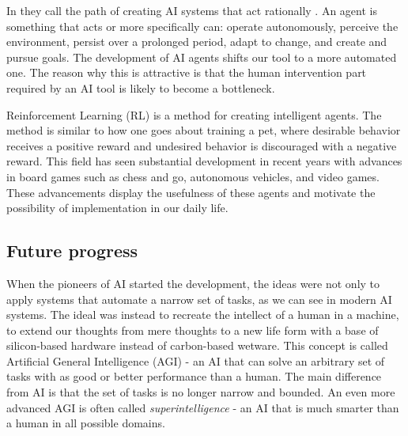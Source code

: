 \documentclass[12pt,A4]{report}
\theoremstyle{definition}
\begin{document}
In \autocite{Russel Norvig} they call the path of creating AI systems that act rationally . An agent is something that acts or more specifically can: operate autonomously, perceive the environment, persist over a prolonged period, adapt to change, and create and pursue goals. The development of AI agents shifts our tool to a more automated one. The reason why this is attractive is that the human intervention part required by an AI tool is likely to become a bottleneck\autocite{T'nkande Maskiner}. 

Reinforcement Learning (RL) is a method for creating intelligent agents. The method is similar to how one goes about training a pet, where desirable behavior receives a positive reward and undesired behavior is discouraged with a negative reward. This field has seen substantial development in recent years with advances in board games such as chess and go\autocite{Silver et al.}, autonomous vehicles\autocite{Levinson et al.}, and video games\autocite{Minh et al.}. These advancements display the usefulness of these agents and motivate the possibility of implementation in our daily life.


\subsection{Future progress}
When the pioneers of AI started the development, the ideas were not only to apply systems that automate a narrow set of tasks, as we can see in modern AI systems. The ideal was instead to recreate the intellect of a human in a machine\autocite{McCarthy et al.}, to extend our thoughts from mere thoughts to a new life form with a base of silicon-based hardware instead of carbon-based wetware. This concept is called Artificial General Intelligence (AGI) - an AI that can solve an arbitrary set of tasks with as good or better performance than a human. The main difference from AI is that the set of tasks is no longer narrow and bounded. An even more advanced AGI is often called \textit{superintelligence} - an AI that is much smarter than a human in all possible domains. \autocite{Superintelligence} 
\end{document}
